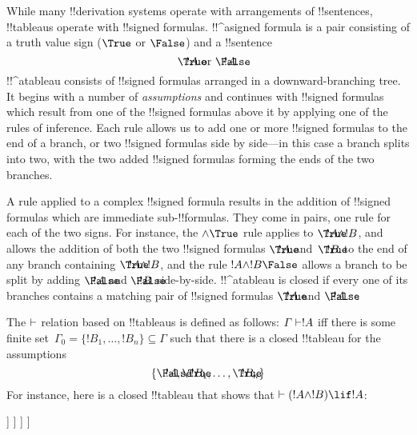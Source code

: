 \documentclass[../../../include/open-logic-section]{subfiles}
\begin{document}
      {}
      {}


While many !!{derivation} systems operate with arrangements of
!!{sentence}s, !!{tableau}s operate with !!{signed formula}s.
!!^a{signed formula} is a pair consisting of a truth value sign
($\True$ or $\False$) and a !!{sentence}
\[
\sFmla{\True}{!A} \text{ or } \sFmla{\False}{!A}.
\]
!!^a{tableau} consists of !!{signed formula}s arranged in a
downward-branching tree. It begins with a number of \emph{assumptions}
and continues with !!{signed formula}s which result from one of the
!!{signed formula}s above it by applying one of the rules of
inference. Each rule allows us to add one or more !!{signed formula}s
to the end of a branch, or two !!{signed formula}s side by side---in
this case a branch splits into two, with the two added !!{signed
  formula}s forming the ends of the two branches.

A rule applied to a complex !!{signed formula} results in the addition
of !!{signed formula}s which are immediate sub-!!{formula}s. They come
in pairs, one rule for each of the two signs.  For instance, the
$\TRule{\True}{\land}$ rule applies to $\sFmla{\True}{!A \land !B}$,
and allows the addition of both the two !!{signed formula}s
$\sFmla{\True}{!A}$ and~$\sFmla{\True}{!B}$ to the end of any branch
containing $\sFmla{\True}{!A \land !B}$, and the rule
$\TRule{\False}{!A \land !B}$ allows a branch to be split by adding
$\sFmla{\False}{!A}$ and $\sFmla{\False}{!B}$ side-by-side.
!!^a{tableau} is closed if every one of its branches contains a
matching pair of !!{signed formula}s $\sFmla{\True}{!A}$ and
$\sFmla{\False}{!A}$.

The $\Proves$ relation based on !!{tableau}s is defined as follows:
$\Gamma \Proves !A$ iff there is some finite set~$\Gamma_0 = \{!B_1,
\dots, !B_n\} \subseteq \Gamma$ such that there is a closed !!{tableau}
for the assumptions
\[
\{\sFmla{\False}{!A}, \sFmla{\True}{!B_1}, \dots, \sFmla{\True}{!B_n}\} 
\]
For instance, here is a closed !!{tableau} that shows that $\Proves
(!A \land !B) \lif !A$:
\begin{oltableau}
  [\sFmla{\False}{(\formula{A} \land \formula{B}) \lif \formula{A}}, just = \TAss
    [\sFmla{\True}{\formula{A} \land \formula{B}}, just = {\TRule{\False}{\lif}[1]}
      [\sFmla{\False}{\formula{A}}, just = {\TRule{\False}{\lif}[1]}
        [\sFmla{\True}{\formula{A}}, just = {\TRule{\True}{\lif}[2]}
          [\sFmla{\True}{\formula{B}}, just = {\TRule{\True}{\lif}[2]}, close]
        ]
      ]
    ]
  ]
\end{oltableau}
\end{document}
